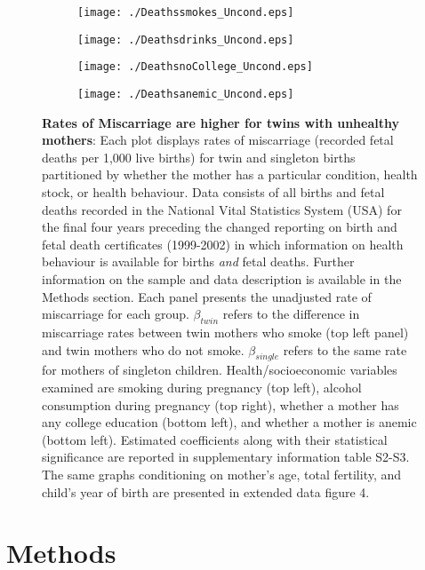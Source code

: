 \documentclass{nature}
\begin{document}
\begin{linenumbers}
\begin{spacing}{1}
\begin{figure}[htpb!]
\begin{subfigure}{.5\textwidth}
  \texttt{[image: ./Deathssmokes\_Uncond.eps]}
\end{subfigure}%
\begin{subfigure}{.5\textwidth}
  \texttt{[image: ./Deathsdrinks\_Uncond.eps]}
\end{subfigure}
\begin{subfigure}{.5\textwidth}
  \texttt{[image: ./DeathsnoCollege\_Uncond.eps]}
\end{subfigure}%
\begin{subfigure}{.5\textwidth}
  \texttt{[image: ./Deathsanemic\_Uncond.eps]}
\end{subfigure}
\vspace{5mm}
\caption{\textbf{Rates of Miscarriage are higher for twins with unhealthy mothers}: {\footnotesize Each plot displays rates of miscarriage (recorded fetal deaths per 1,000 live births) for twin and singleton births partitioned by whether the mother has a particular condition, health stock, or health behaviour.  Data consists of all births and fetal deaths recorded in the National Vital Statistics System (USA) for the final four years preceding the changed reporting on birth and fetal death certificates (1999-2002) in which information on health behaviour is available for births \emph{and} fetal deaths.  Further information on the sample and data description is available in the Methods section.  Each panel presents the unadjusted rate of miscarriage for each group.  $\beta_{twin}$ refers to the difference in miscarriage rates between twin mothers who smoke (top left panel) and twin mothers who do not smoke. $\beta_{single}$ refers to the same rate for mothers of singleton children.  Health/socioeconomic variables examined are smoking during pregnancy (top left), alcohol consumption during pregnancy (top right), whether a mother has any college education (bottom left), and whether a mother is anemic (bottom left).  Estimated coefficients along with their statistical significance are reported in supplementary information table S2-S3.  The same graphs conditioning on mother's age, total fertility, and child's year of birth are presented in extended data figure 4.}}
\label{fig:mech}
\end{figure}
\end{spacing}


\clearpage
\section{Methods}

\end{linenumbers}
\end{document}
